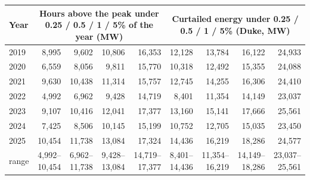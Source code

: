 \begin{tabular}{lrrrrrrrr}
\toprule
Year & \multicolumn{4}{c}{Hours above the peak under 0.25 / 0.5 / 1 / 5\% of the year (MW)} & \multicolumn{4}{c}{Curtailed energy under 0.25 / 0.5 / 1 / 5\% (Duke, MW)} \\
\midrule
2019 & 8,995 & 9,602 & 10,806 & 16,353 & 12,128 & 13,784 & 16,122 & 24,933 \\
2020 & 6,559 & 8,056 & 9,811 & 15,770 & 10,318 & 12,492 & 15,355 & 24,088 \\
2021 & 9,630 & 10,438 & 11,314 & 15,757 & 12,745 & 14,255 & 16,306 & 24,410 \\
2022 & 4,992 & 6,962 & 9,428 & 14,719 & 8,401 & 11,354 & 14,149 & 23,037 \\
2023 & 9,107 & 10,416 & 12,041 & 17,377 & 13,160 & 15,141 & 17,666 & 25,561 \\
2024 & 7,425 & 8,506 & 10,145 & 15,199 & 10,752 & 12,705 & 15,035 & 23,450 \\
2025 & 10,454 & 11,738 & 13,084 & 17,324 & 14,436 & 16,219 & 18,286 & 24,577 \\
\midrule
range & 4,992--10,454 & 6,962--11,738 & 9,428--13,084 & 14,719--17,377 & 8,401--14,436 & 11,354--16,219 & 14,149--18,286 & 23,037--25,561 \\
\bottomrule
\end{tabular}
